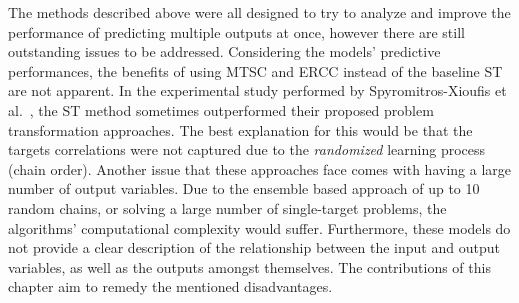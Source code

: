 \documentclass[reqno]{vcuthesis}
\numberwithin{equation}{chapter}
\begin{document}
The methods described above were all designed to try to analyze and improve the performance of predicting multiple outputs at once, however there are still outstanding issues to be addressed. Considering the models' predictive performances, the benefits of using MTSC and ERCC instead of the baseline ST are not apparent. In the experimental study performed by Spyromitros-Xioufis et al.~\cite{Spyromitros2014}, the ST method sometimes outperformed their proposed problem transformation approaches. The best explanation for this would be that the targets correlations were not captured due to the \textit{randomized} learning process (chain order). Another issue that these approaches face comes with having a large number of output variables. Due to the ensemble based approach of up to 10 random chains, or solving a large number of single-target problems, the algorithms' computational complexity would suffer. Furthermore, these models do not provide a clear description of the relationship between the input and output variables, as well as the outputs amongst themselves. The contributions of this chapter aim to remedy the mentioned disadvantages.
\end{document}

